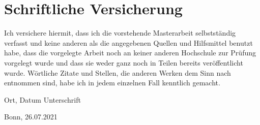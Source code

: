 \newpage
{}
\section*{Schriftliche Versicherung}

Ich versichere hiermit, dass ich die vorstehende Masterarbeit selbstst{\"a}ndig verfasst und keine anderen als die angegebenen Quellen und Hilfsmittel benutzt habe, dass die vorgelegte Arbeit noch an keiner anderen Hochschule zur Pr{\"u}fung vorgelegt wurde und dass sie weder ganz noch in Teilen bereits ver{\"o}ffentlicht  wurde. W{\"o}rtliche Zitate und Stellen, die anderen Werken dem Sinn nach entnommen sind, habe ich in jedem einzelnen Fall kenntlich gemacht.

\vspace{4cm}

\hspace{1cm} Ort, Datum \hfill Unterschrift \hspace{2cm} 

\vspace{0.1cm}

\hspace{0.55cm} Bonn, 26.07.2021 
